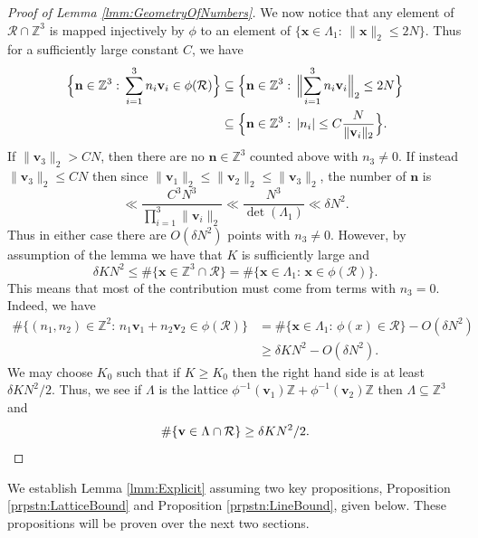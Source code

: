 \documentclass[10pt]{amsart}
\theoremstyle{plain}
\numberwithin{sblmm}{thrm}
\numberwithin{equation}{section}
\begin{document}
\begin{proof}[Proof of Lemma \ref{lmm:GeometryOfNumbers}]
We now notice that any element of $\mathcal{R}\cap\mathbb{Z}^3$ is mapped injectively by $\phi$ to an element of $\{\mathbf{x}\in\Lambda_1:\,\|\mathbf{x}\|_2\le 2N\}$. Thus for a sufficiently large constant $C$, we have
\begin{align*}
\Bigl\{\mathbf{n}\in\mathbb{Z}^3:\,\sum_{i=1}^3n_i\mathbf{v}_i\in\phi(\mathcal{R})\Bigr\}&\subseteq\Bigl\{\mathbf{n}\in\mathbb{Z}^3:\,\Bigl\|\sum_{i=1}^3n_i\mathbf{v}_i\Bigr\|_2\le 2N\Bigr\}\\
&\subseteq\Bigl\{\mathbf{n}\in\mathbb{Z}^3: \, |n_i|\le C\frac{N}{\|\mathbf{v}_i\|_2}\Bigr\}.
\end{align*}
If $\|\mathbf{v}_3\|_2>C N$, then there are no $\mathbf{n}\in\mathbb{Z}^3$ counted above with $n_3\ne 0$. If instead $\|\mathbf{v}_3\|_2\le C N$ then since $\|\mathbf{v}_1\|_2\le\|\mathbf{v}_2\|_2\le\|\mathbf{v}_3\|_2$, the number of $\mathbf{n}$ is
\[
\ll \frac{C^3N^3}{\prod_{i=1}^3\|\mathbf{v}_i\|_2}\ll \frac{N^3}{\det(\Lambda_1)}\ll\delta N^2. 
\]
Thus in either case there are $O(\delta N^2)$ points with $n_3\ne 0$. However, by assumption of the lemma we have that $K$ is sufficiently large and 
\[
\delta K N^2\le \#\{\mathbf{x}\in\mathbb{Z}^3\cap\mathcal{R}\}=\#\{\mathbf{x}\in\Lambda_1:\,\mathbf{x}\in\phi(\mathcal{R})\}.
\]
This means that most of the contribution must come from terms with $n_3=0$. Indeed, we have
\begin{align*}
\#\{(n_1,n_2)\in\mathbb{Z}^2:\,n_1\mathbf{v}_1+n_2\mathbf{v}_2\in \phi(\mathcal{R})\}&= \#\{\mathbf{x}\in\Lambda_1:\,\phi(x)\in\mathcal{R}\}-O(\delta N^2)\\
&\ge \delta K N^2-O(\delta N^2).
\end{align*}
We may choose $K_0$ such that if $K\ge K_0$ then the right hand side is at least $\delta KN^2/2$. Thus, we see if $\Lambda$ is the lattice $\phi^{-1}(\mathbf{v}_1)\mathbb{Z}+\phi^{-1}(\mathbf{v}_2)\mathbb{Z}$ then $\Lambda\subseteq\mathbb{Z}^3$ and 
\[
\#\{\mathbf{v}\in\Lambda\cap\mathcal{R}\}\ge \delta KN^2/2.\qedhere
\]
%
\end{proof}
%
%
%
%
We establish Lemma \ref{lmm:Explicit} assuming two key propositions, Proposition \ref{prpstn:LatticeBound} and Proposition \ref{prpstn:LineBound}, given below. These propositions will be proven over the next two sections.
%
%
%
%
\end{document}
